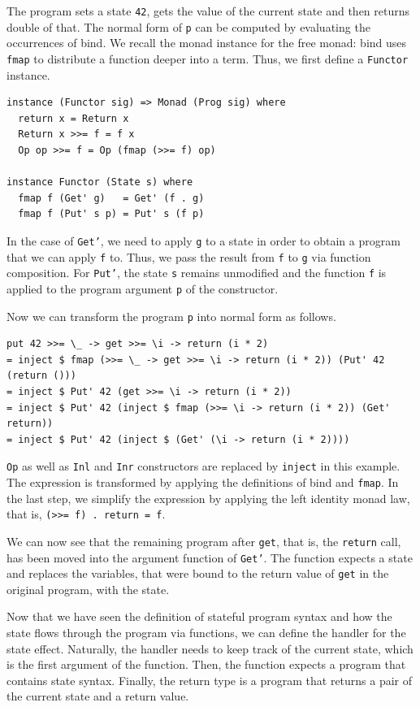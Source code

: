 \documentclass[a4paper, 11pt, fleqn, twoside]{scrreprt}
\newcommand{\hinl}[1]{\texttt{#1}}
\begin{document}
The program sets a state \hinl{42}, gets the value of the current state and then returns double of that.
The normal form of \hinl{p} can be computed by evaluating the occurrences of bind.
We recall the monad instance for the free monad: bind uses \hinl{fmap} to distribute a function deeper into a term.
Thus, we first define a \hinl{Functor} instance.

\begin{verbatim}
instance (Functor sig) => Monad (Prog sig) where
  return x = Return x
  Return x >>= f = f x
  Op op >>= f = Op (fmap (>>= f) op)

instance Functor (State s) where
  fmap f (Get' g)   = Get' (f . g)
  fmap f (Put' s p) = Put' s (f p)
\end{verbatim}

In the case of \hinl{Get'}, we need to apply \hinl{g} to a state in order to obtain a program that we can apply \hinl{f} to.
Thus, we pass the result from \hinl{f} to \hinl{g} via function composition.
For \hinl{Put'}, the state \hinl{s} remains unmodified and the function \hinl{f} is applied to the program argument \hinl{p} of the constructor.

Now we can transform the program \hinl{p} into normal form as follows.

\begin{verbatim}
put 42 >>= \_ -> get >>= \i -> return (i * 2)
= inject $ fmap (>>= \_ -> get >>= \i -> return (i * 2)) (Put' 42 (return ()))
= inject $ Put' 42 (get >>= \i -> return (i * 2))
= inject $ Put' 42 (inject $ fmap (>>= \i -> return (i * 2)) (Get' return))
= inject $ Put' 42 (inject $ (Get' (\i -> return (i * 2))))
\end{verbatim}

\hinl{Op} as well as \hinl{Inl} and \hinl{Inr} constructors are replaced by \hinl{inject} in this example.
The expression is transformed by applying the definitions of bind and \hinl{fmap}.
In the last step, we simplify the expression by applying the left identity monad law, that is, \hinl{(>>= f) . return = f}.

We can now see that the remaining program after \hinl{get}, that is, the \hinl{return} call, has been moved into the argument function of \hinl{Get'}.
The function expects a state and replaces the variables, that were bound to the return value of \hinl{get} in the original program, with the state.

Now that we have seen the definition of stateful program syntax and how the state flows through the program via functions, we can define the handler for the state effect.
Naturally, the handler needs to keep track of the current state, which is the first argument of the function.
Then, the function expects a program that contains state syntax.
Finally, the return type is a program that returns a pair of the current state and a return value.
\end{document}
